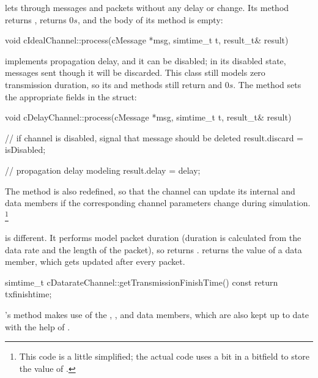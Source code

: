  lets through messages and packets without
any delay or change. Its  method returns
,  returns $0s$, and the
body of its  method is empty:

\begin{cpp}
void cIdealChannel::process(cMessage *msg, simtime_t t, result_t& result)
{
}
\end{cpp}

 implements propagation delay, and it can be
disabled; in its disabled state, messages sent though it will be discarded.
This class still models zero transmission duration, so its
 and 
methods still return  and $0s$. The  method
sets the appropriate fields in the  struct:

\begin{cpp}
void cDelayChannel::process(cMessage *msg, simtime_t t, result_t& result)
{
    // if channel is disabled, signal that message should be deleted
    result.discard = isDisabled;

    // propagation delay modeling
    result.delay = delay;
}
\end{cpp}

The  method is also redefined, so that
the channel can update its internal  and 
data members if the corresponding channel parameters change during simulation.
\footnote{This code is a little simplified; the actual code uses a bit
in a bitfield to store the value of .}

 is different. It performs model packet duration
(duration is calculated from the data rate and the length of the packet),
so  returns .
 returns the value of a 
data member, which gets updated after every packet.

\begin{cpp}
simtime_t cDatarateChannel::getTransmissionFinishTime() const
{
    return txfinishtime;
}
\end{cpp}

's  method makes use of
the , ,  and  data
members, which are also kept up to date with the help of
.

